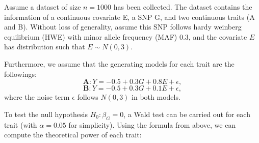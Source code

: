 \documentclass[
]{article}
\begin{document}
Assume a dataset of size \(n=1000\) has been collected. The dataset
contains the information of a continuous covariate E, a SNP G, and two
continuous traits (A and B). Without loss of generality, assume this SNP
follows hardy weinberg equilibrium (HWE) with minor allele frequency
(MAF) \(0.3\), and the covariate \(E\) has distribution such that
\(E\sim N(0,3)\).

Furthermore, we assume that the generating models for each trait are the
followings: \[\textbf{A}:Y = -0.5 + 0.3G + 0.8E + \epsilon,\]
\[\textbf{B}: Y = -0.5 + 0.3G + 0.1E + \epsilon,\] where the noise term
\(\epsilon\) follows \(N(0,3)\) in both models.

To test the null hypothesis \(H_0: \beta_G = 0\), a Wald test can be
carried out for each trait (with \(\alpha=0.05\) for simplicity). Using
the formula from above, we can compute the theoretical power of each
trait:
\end{document}
